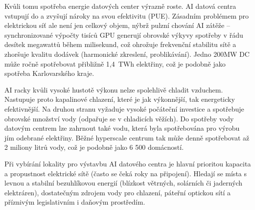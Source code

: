 Kvůli tomu spotřeba energie datových center výrazně roste. AI datová centra vstupují do  a zvyšují nároky na svou efektivitu (PUE). Zásadním problémem pro elektrickou síť ale není jen celkový objem, nýbrž pulzní chování AI zátěže -- synchronizované výpočty tisíců GPU generují obrovské výkyvy spotřeby v řádu desítek megawattů během milisekund, což ohrožuje frekvenční stabilitu sítě a zhoršuje kvalitu dodávek (harmonické zkreslení, problikávání). Jedno 200MW DC může ročně spotřebovat přibližně 1,4~TWh elektřiny, což je podobně jako spotřeba Karlovarského kraje.~\cite{sheng_power_2026,chen_electricity_2025, energeticky_regulacni_urad_spotreba_2024}

AI racky kvůli vysoké hustotě výkonu nelze spolehlivě chladit vzduchem. Nastupuje proto kapalinové chlazení, které je jak výkonnější, tak energeticky efektivnější. Na druhou stranu vyžaduje vysoké počáteční investice a spotřebuje obrovské množství vody (odpařuje se v chladicích věžích). Do spotřeby vody datovým centrem lze zahrnout také vodu, která byla spotřebována pro výrobu jím odebrané elektřiny. Běžné hyperscale centrum tak může denně spotřebovat až 2 miliony litrů vody, což je podobně jako 6 500 domácností.~\cite{jegham_how_2025,cruzes_data_2025,international_energy_agency_iea_energy_2025,shah_four_2026}

Při vybírání lokality pro výstavbu AI datového centra je hlavní prioritou kapacita a propustnost elektrické sítě (často se čeká roky na připojení). Hledají se místa s levnou a stabilní bezuhlíkovou energií (blízkost větrných, solárních či jaderných elektráren), dostatečným zdrojem vody pro chlazení, páteřní optickou sítí a příznivým legislativním i daňovým prostředím.~\cite{geng_data_2014, chen_electricity_2025, pilz_compute_2023, lin_exploding_2024}
